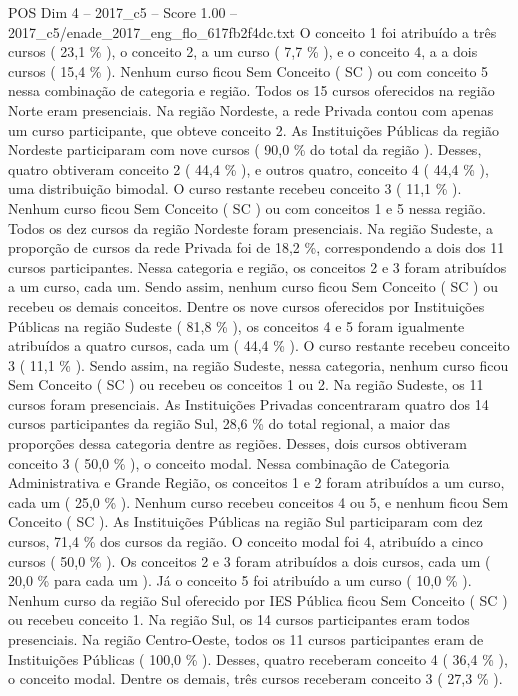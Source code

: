 \begin{textsample}{POS Dim 4 – 2017\_c5 – Score 1.00 – 2017\_c5/enade\_2017\_eng\_flo\_617fb2f4dc.txt}
O conceito 1 foi atribuído a três cursos ( 23,1 \% ), o conceito 2, a um curso ( 7,7 \% ), e o conceito 4, a a dois cursos ( 15,4 \% ).
Nenhum curso ficou Sem Conceito ( SC ) ou com conceito 5 nessa combinação de categoria e região.
Todos os 15 cursos oferecidos na região Norte eram presenciais.
Na região Nordeste, a rede Privada contou com apenas um curso participante, que obteve conceito 2.
As Instituições Públicas da região Nordeste participaram com nove cursos ( 90,0 \% do total da região ).
Desses, quatro obtiveram conceito 2 ( 44,4 \% ), e outros quatro, conceito 4 ( 44,4 \% ), uma distribuição bimodal.
O curso restante recebeu conceito 3 ( 11,1 \% ).
Nenhum curso ficou Sem Conceito ( SC ) ou com conceitos 1 e 5 nessa região.
Todos os dez cursos da região Nordeste foram presenciais.
Na região Sudeste, a proporção de cursos da rede Privada foi de 18,2 \%, correspondendo a dois dos 11 cursos participantes.
Nessa categoria e região, os conceitos 2 e 3 foram atribuídos a um curso, cada um.
Sendo assim, nenhum curso ficou Sem Conceito ( SC ) ou recebeu os demais conceitos.
Dentre os nove cursos oferecidos por Instituições Públicas na região Sudeste ( 81,8 \% ), os conceitos 4 e 5 foram igualmente atribuídos a quatro cursos, cada um ( 44,4 \% ).
O curso restante recebeu conceito 3 ( 11,1 \% ).
Sendo assim, na região Sudeste, nessa categoria, nenhum curso ficou Sem Conceito ( SC ) ou recebeu os conceitos 1 ou 2.
Na região Sudeste, os 11 cursos foram presenciais.
As Instituições Privadas concentraram quatro dos 14 cursos participantes da região Sul, 28,6 \% do total regional, a maior das proporções dessa categoria dentre as regiões.
Desses, dois cursos obtiveram conceito 3 ( 50,0 \% ), o conceito modal.
Nessa combinação de Categoria Administrativa e Grande Região, os conceitos 1 e 2 foram atribuídos a um curso, cada um ( 25,0 \% ).
Nenhum curso recebeu conceitos 4 ou 5, e nenhum ficou Sem Conceito ( SC ).
As Instituições Públicas na região Sul participaram com dez cursos, 71,4 \% dos cursos da região.
O conceito modal foi 4, atribuído a cinco cursos ( 50,0 \% ).
Os conceitos 2 e 3 foram atribuídos a dois cursos, cada um ( 20,0 \% para cada um ).
Já o conceito 5 foi atribuído a um curso ( 10,0 \% ).
Nenhum curso da região Sul oferecido por IES Pública ficou Sem Conceito ( SC ) ou recebeu conceito 1.
Na região Sul, os 14 cursos participantes eram todos presenciais.
Na região Centro-Oeste, todos os 11 cursos participantes eram de Instituições Públicas ( 100,0 \% ).
Desses, quatro receberam conceito 4 ( 36,4 \% ), o conceito modal.
Dentre os demais, três cursos receberam conceito 3 ( 27,3 \% ).

\end{textsample}

